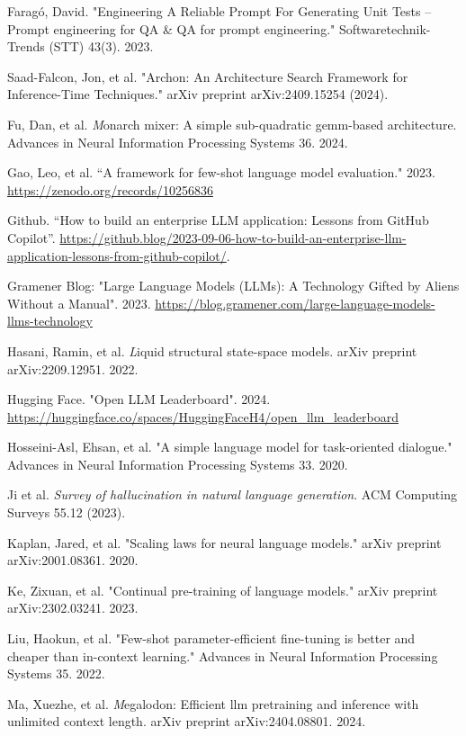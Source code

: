 \documentclass[twocolumn]{article}
\begin{document}
\begin{thebibliography}{99}
 Faragó, David. "Engineering A Reliable Prompt For Generating Unit Tests -- Prompt engineering for QA \& QA for prompt engineering." Softwaretechnik-Trends (STT) 43(3). 2023.

 Saad-Falcon, Jon, et al. "Archon: An Architecture Search Framework for Inference-Time Techniques." arXiv preprint arXiv:2409.15254 (2024).

 Fu, Dan, et al. {\emph Monarch mixer: A simple sub-quadratic gemm-based architecture}. Advances in Neural Information Processing Systems 36. 2024.
  
 Gao, Leo, et al. “A framework for few-shot language model evaluation." 2023. \url{https://zenodo.org/records/10256836}

 Github. “How to build an enterprise LLM application: Lessons from GitHub Copilot”. \url{https://github.blog/2023-09-06-how-to-build-an-enterprise-llm-application-lessons-from-github-copilot/}.

 Gramener Blog: "Large Language Models (LLMs): A Technology Gifted by Aliens Without a Manual". 2023. \url{https://blog.gramener.com/large-language-models-llms-technology}

 Hasani, Ramin, et al. {\emph Liquid structural state-space models}. arXiv preprint arXiv:2209.12951. 2022.
  
 Hugging Face. "Open LLM Leaderboard". 2024. \url{https://huggingface.co/spaces/HuggingFaceH4/open_llm_leaderboard}

 Hosseini-Asl, Ehsan, et al. "A simple language model for task-oriented dialogue." Advances in Neural Information Processing Systems 33. 2020.

 Ji et al. {\em Survey of hallucination in natural language generation}. ACM Computing Surveys 55.12 (2023).

 Kaplan, Jared, et al. "Scaling laws for neural language models." arXiv preprint arXiv:2001.08361. 2020.

 Ke, Zixuan, et al. "Continual pre-training of language models." arXiv preprint arXiv:2302.03241. 2023.

 Liu, Haokun, et al. "Few-shot parameter-efficient fine-tuning is better and cheaper than in-context learning." Advances in Neural Information Processing Systems 35. 2022.

 Ma, Xuezhe, et al. {\emph Megalodon: Efficient llm pretraining and inference with unlimited context length}. arXiv preprint arXiv:2404.08801. 2024.
  

\end{thebibliography}
\end{document}
